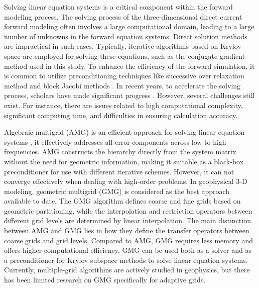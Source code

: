 \documentclass[extra, referee]{gji}
\begin{document}
Solving linear equation systems is a critical component within the forward
modeling process. The solving process of the three-dimensional direct current
forward modeling often involves a large computational domain, leading to a large
number of unknowns in the forward equation systems. Direct solution methods are
impractical in such cases. Typically, iterative algorithms based on Krylov space
are employed for solving these equations, such as the conjugate gradient
\citep{Kronbichler2022,Guo2023,Amdouni2022} method used in this study. To
enhance the efficiency of the forward simulation, it is common to utilize
preconditioning techniques like successive over relaxation method \citep{Li2023}
and block Jacobi methods \citep{Haleem2023}. In recent years, to accelerate the
solving process, scholars have made significant progress . However, several
challenges still exist. For instance, there are issues related to high
computational complexity, significant computing time, and difficulties in
ensuring calculation accuracy.

Algebraic multigrid (AMG) is an efficient approach for solving linear equation
systems \citep{Okusanya2004,Farris1998,Wang2023}, it effectively addresses all
error components across low to high frequencies. AMG constructs the hierarchy
directly from the system matrix without the need for geometric information,
making it suitable as a black-box preconditioner for use with different
iterative schemes. However, it can not converge effectively when dealing with
high-order problems. In geophysical 3-D modeling, geometric multigrid
(GMG)\citep{Pan2022,Teunissen2023,Munch2023} is considered as the best approach
available to date. The GMG algorithm defines coarse and fine grids based on
geometric partitioning, while the interpolation and restriction operators
between different grid levels are determined by linear interpolation. The main
distinction between AMG and GMG lies in how they define the transfer operators
between coarse grids and grid levels. Compared to AMG, GMG requires less memory
and offers higher computational efficiency. GMG can be used both as a solver and
as a preconditioner for Krylov subspace \citep{Lu2014,HerreroPrez2023,Ilin2023}
methods to solve linear equation systems. Currently, multiple-grid algorithms
are actively studied in geophysics,  but there has been limited research on GMG
specifically for adaptive grids.
\end{document}
